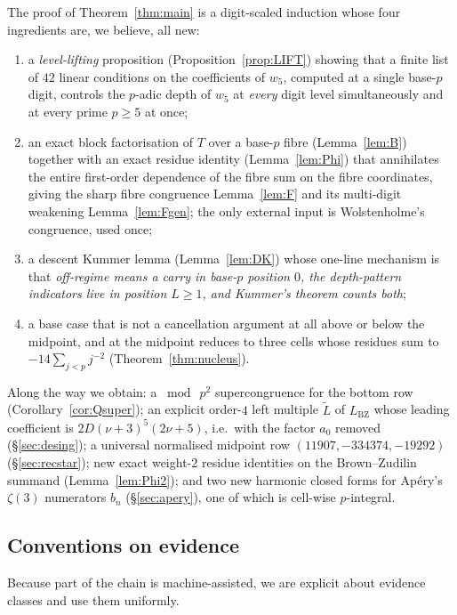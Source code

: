 \documentclass[11pt,reqno]{amsart}
\theoremstyle{plain}
\theoremstyle{definition}
\theoremstyle{remark}
\numberwithin{equation}{section}
\newcommand{\LBZ}{L_{\mathrm{BZ}}}
\newcommand{\wfive}{w_5}
\begin{document}
The proof of Theorem~\ref{thm:main} is a digit-scaled induction whose four ingredients are, we
believe, all new:
\begin{enumerate}[leftmargin=1.9em,label=\textup{(\arabic*)}]
\item a \emph{level-lifting} proposition (Proposition~\ref{prop:LIFT}) showing that a finite
  list of $42$ linear conditions on the coefficients of $\wfive$, computed at a single
  base-$p$ digit, controls the $p$-adic depth of $\wfive$ at \emph{every} digit level
  simultaneously and at every prime $p\ge5$ at once;
\item an exact block factorisation of $T$ over a base-$p$ fibre (Lemma~\ref{lem:B}) together
  with an exact residue identity (Lemma~\ref{lem:Phi}) that annihilates the entire first-order
  dependence of the fibre sum on the fibre coordinates, giving the sharp fibre congruence
  Lemma~\ref{lem:F} and its multi-digit weakening Lemma~\ref{lem:Fgen}; the only external
  input is Wolstenholme's congruence, used once;
\item a descent Kummer lemma (Lemma~\ref{lem:DK}) whose one-line mechanism is that
  \emph{off-regime means a carry in base-$p$ position $0$, the depth-pattern indicators live
  in position $L\ge1$, and Kummer's theorem counts both};
\item a base case that is not a cancellation argument at all above or below the midpoint, and
  at the midpoint reduces to three cells whose residues sum to $-14\sum_{j<p}j^{-2}$
  (Theorem~\ref{thm:nucleus}).
\end{enumerate}

Along the way we obtain: a $\bmod\ p^2$ supercongruence for the bottom row
(Corollary~\ref{cor:Qsuper}); an explicit order-$4$ left multiple $\tilde L$ of $\LBZ$ whose
leading coefficient is $2D(\nu+3)^5(2\nu+5)$, i.e.\ with the factor $a_0$ removed
(\S\ref{sec:desing}); a universal normalised midpoint row
$(11907,-334374,-19292)$ (\S\ref{sec:recstar}); new exact weight-$2$ residue identities on the
Brown--Zudilin summand (Lemma~\ref{lem:Phi2}); and two new harmonic closed forms for Ap\'ery's
$\zeta(3)$ numerators $b_n$ (\S\ref{sec:apery}), one of which is cell-wise $p$-integral.

\subsection{Conventions on evidence}\label{sec:evidence}

Because part of the chain is machine-assisted, we are explicit about evidence classes and use
them uniformly.
\end{document}
